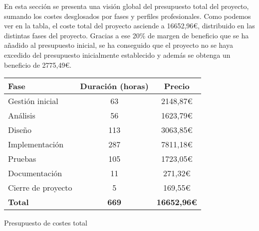 En esta sección se presenta una visión global del presupuesto total del proyecto, sumando los costes desglosados por fases y perfiles profesionales.
Como podemos ver en la tabla, el coste total del proyecto asciende a 16652,96€, distribuido en las distintas fases del proyecto. Gracias a ese 20\% de margen de beneficio que se ha añadido al presupuesto inicial, se ha conseguido que el proyecto no se haya excedido del presupuesto inicialmente establecido y además se obtenga un beneficio de 2775,49€.
\begin{planificacion}
	\centering
	\begin{tabular}{ | m{9cm} | c | c |}
		\hline
		\textbf{Fase}      & \textbf{Duración (horas)} & \textbf{Precio}    \\\hline
		Gestión inicial    & 63                        & 2148,87€           \\\hline
		Análisis           & 56                        & 1623,79€           \\\hline
		Diseño             & 113                       & 3063,85€           \\\hline
		Implementación     & 287                       & 7811,18€           \\\hline
		Pruebas            & 105                       & 1723,05€           \\\hline
		Documentación      & 11                        & 271,32€            \\\hline
		Cierre de proyecto & 5                         & 169,55€            \\\hline
		\textbf{Total}     & \textbf{669}              & \textbf{16652,96€} \\\hline
	\end{tabular}
	\caption{Presupuesto de costes total}
\end{planificacion}
